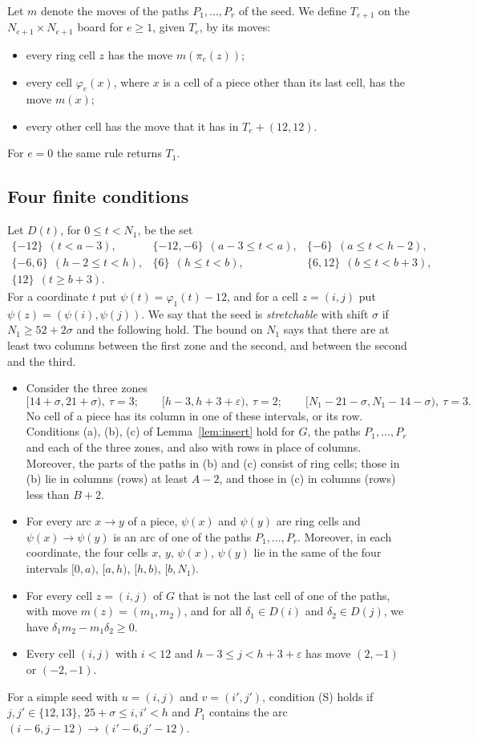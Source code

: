 \documentclass[11pt]{amsart}
\theoremstyle{remark}
\begin{document}
Let $m$ denote the moves of the paths $P_1,\dots,P_r$ of the seed. We define $T_{e+1}$ on the
$N_{e+1}\times N_{e+1}$ board for $e\ge1$, given $T_e$, by its moves:
\begin{itemize}
\item every ring cell $z$ has the move $m(\pi_e(z))$;
\item every cell $\varphi_e(x)$, where $x$ is a cell of a piece other than its last cell, has the move $m(x)$;
\item every other cell has the move that it has in $T_e+(12,12)$.
\end{itemize}
For $e=0$ the same rule returns $T_1$.

\subsection*{Four finite conditions}
Let $D(t)$, for $0\le t<N_1$, be the set
\[\begin{array}{lll}
\{-12\}\ \ (t<a-3), & \{-12,-6\}\ \ (a-3\le t<a), & \{-6\}\ \ (a\le t<h-2),\\
\{-6,6\}\ \ (h-2\le t<h), & \{6\}\ \ (h\le t<b), & \{6,12\}\ \ (b\le t<b+3),\\
\{12\}\ \ (t\ge b+3).
\end{array}\]
For a coordinate $t$ put $\psi(t)=\varphi_1(t)-12$, and for a cell $z=(i,j)$ put $\psi(z)=(\psi(i),\psi(j))$. We
say that the seed is \emph{stretchable} with shift $\sigma$ if $N_1\ge52+2\sigma$ and the following hold. The bound on $N_1$
says that there are at least two columns between the first zone and the second, and between the second and the third.
\begin{itemize}
\item[(Z)] Consider the three zones
\[ [14+\sigma,21+\sigma),\ \tau=3;\qquad [h-3,h+3+\varepsilon),\ \tau=2;\qquad
[N_1-21-\sigma,N_1-14-\sigma),\ \tau=3. \]
No cell of a piece has its column in one of these intervals, or its row. Conditions (a), (b), (c) of
Lemma~\ref{lem:insert} hold for $G$, the paths $P_1,\dots,P_r$ and each of the three zones, and also with rows in
place of columns. Moreover, the parts of the paths in (b) and (c) consist of ring cells; those in (b) lie in columns
(rows) at least $A-2$, and those in (c) in columns (rows) less than $B+2$.
\item[(S)] For every arc $x\to y$ of a piece, $\psi(x)$ and $\psi(y)$ are ring cells and $\psi(x)\to\psi(y)$ is an
arc of one of the paths $P_1,\dots,P_r$. Moreover, in each coordinate, the four cells $x$, $y$, $\psi(x)$,
$\psi(y)$ lie in the same of the four intervals $[0,a)$, $[a,h)$, $[h,b)$, $[b,N_1)$.
\item[(W)] For every cell $z=(i,j)$ of $G$ that is not the last cell of one of the paths, with move $m(z)=(m_1,m_2)$,
and for all $\delta_1\in D(i)$ and $\delta_2\in D(j)$, we have $\delta_1m_2-m_1\delta_2\ge0$.
\item[(C)] Every cell $(i,j)$ with $i<12$ and $h-3\le j<h+3+\varepsilon$ has move $(2,-1)$ or $(-2,-1)$.
\end{itemize}
For a simple seed with $u=(i,j)$ and $v=(i',j')$, condition (S) holds if $j,j'\in\{12,13\}$, $25+\sigma\le i,i'<h$
and $P_1$ contains the arc $(i-6,j-12)\to(i'-6,j'-12)$.
\end{document}
